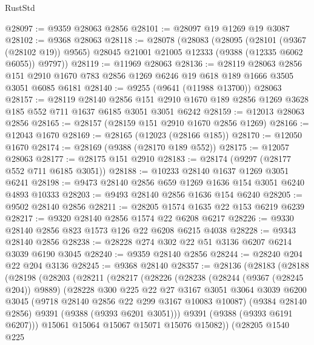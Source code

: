 \begin{lexlean}{RustStd}
\begin{coremodule}
@28097 := @9359 @28063 @2856
@28101 := @28097 @19 @1269 @19 @3087
@28102 := @9368 @28063
@28118 := @28078
    (@28083
      (@28095
        (@28101 (@9367 (@28102 @19)) @9565)
        @28045
        @21001
        @21005
        @12333
        (@9388 (@12335 @6062 @6055))
        @9797))
@28119 := @11969 @28063
@28136 := @28119
    @28063
    @2856
    @151
    @2910
    @1670
    @783
    @2856
    @1269
    @6246
    @19
    @618
    @189
    @1666
    @3505
    @3051
    @6085
    @6181
@28140 := @9255 (@9641 (@11988 @13700)) @28063
@28157 := @28119
    @28140
    @2856
    @151
    @2910
    @1670
    @189
    @2856
    @1269
    @3628
    @185
    @552
    @711
    @1637
    @6185
    @3051
    @3051
    @6242
@28159 := @12013 @28063 @2856
@28165 := @28157 (@28159 @151 @2910 @1670 @2856 @1269)
@28166 := @12043 @1670
@28169 := @28165 (@12023 (@28166 @185))
@28170 := @12050 @1670
@28174 := @28169 (@9388 (@28170 @189 @552))
@28175 := @12057 @28063
@28177 := @28175 @151 @2910
@28183 := @28174 (@9297 (@28177 @552 @711 @6185 @3051))
@28188 := @10233 @28140 @1637 @1269 @3051 @6241
@28198 := @9473 @28140 @2856 @659 @1269 @1636 @154 @3051 @6240 @4893 @10333
@28203 := @9493 @28140 @2856 @1636 @154 @6240
@28205 := @9502 @28140 @2856
@28211 := @28205 @1574 @1635 @22 @153 @6219 @6239
@28217 := @9320 @28140 @2856 @1574 @22 @6208 @6217
@28226 := @9330 @28140 @2856 @823 @1573 @126 @22 @6208 @6215 @4038
@28228 := @9343 @28140 @2856
@28238 := @28228 @274 @302 @22 @51 @3136 @6207 @6214 @3039 @6190 @3045
@28240 := @9359 @28140 @2856
@28244 := @28240 @204 @22 @204 @3136
@28245 := @9368 @28140
@28357 := @28136
    (@28183
      (@28188
        (@28198
          (@28203
            (@28211
              (@28217
                (@28226
                  (@28238
                    (@28244 (@9367 (@28245 @204)) @9889)
                    (@28228
                      @300
                      @225
                      @22
                      @27
                      @3167
                      @3051
                      @3064
                      @3039
                      @6200
                      @3045
                      (@9718 @28140 @2856 @22 @299 @3167 @10083 @10087)
                      (@9384 @28140 @2856)
                      @9391
                      (@9388 (@9393 @6201 @3051)))
                    @9391
                    (@9388 (@9393 @6191 @6207)))
                  @15061
                  @15064
                  @15067
                  @15071
                  @15076
                  @15082))
              (@28205
                @1540
                @225

\end{coremodule}
\end{lexlean}
